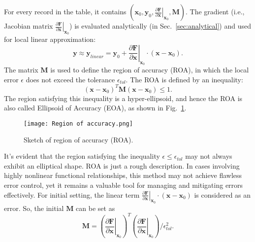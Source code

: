 For every record in the table, it contains $(\mathbf{x}_0,\mathbf{y}_0,\left.\frac{\partial  \mathbf{F}}{\partial \mathbf{x}}\right|_{\mathbf{x}_0}, \mathbf{M})$.
The gradient (i.e., Jacobian matrix $\left.\frac{\partial  \mathbf{F}}{\partial \mathbf{x}}\right|_{\mathbf{x}_0}$) is evaluated analytically (in Sec.~\ref{sec:analytical}) and used for local linear approximation:
$$\mathbf{y}\approx\mathbf{y}_{linear}=\mathbf{y}_0+\left.\frac{\partial  \mathbf{F}}{\partial \mathbf{x}}\right|_{\mathbf{x}_0}\cdot\left(\mathbf{x}-\mathbf{x}_0\right).$$
The matrix $\mathbf{M}$ is used to define the region of accuracy (ROA), in which the local error
$\epsilon$ does not exceed the tolerance $\epsilon_{tol}$. The ROA is defined by an inequality:
$$\left(\mathbf{x}-\mathbf{x}_0\right)^T \mathbf{M} \left(\mathbf{x}-\mathbf{x}_0\right) \leq 1.$$
The region satisfying this inequality is a hyper-ellipsoid, and hence the ROA is also called Ellipsoid of Accuracy (EOA), as shown in Fig.~\ref{ISAT_ROA}.
\begin{figure}[htbp]
	\centering
	\texttt{[image: Region of accuracy.png]}
	\caption{Sketch of region of accuracy (ROA).}
	\label{ISAT_ROA}
\end{figure}
It's evident that the region satisfying the inequality $ \epsilon \leq \epsilon_{tol}$ may not always exhibit an elliptical shape. ROA is just a rough description. In cases involving highly nonlinear functional relationships, this method may not achieve flawless error control, yet it remains a valuable tool for managing and mitigating errors effectively.
For initial setting, the linear term $\left.\frac{\partial  \mathbf{F}}{\partial \mathbf{x}}\right|_{\mathbf{x}_0}\cdot\left(\mathbf{x}-\mathbf{x}_0\right)$ is considered as an error. So, the initial $\mathbf{M}$ can be set as
$$\mathbf{M}=\left(\left.\frac{\partial  \mathbf{F}}{\partial \mathbf{x}}\right|_{\mathbf{x}_0}\right)^T \left(\left.\frac{\partial  \mathbf{F}}{\partial \mathbf{x}}\right|_{\mathbf{x}_0}\right)/\epsilon_{tol}^2.$$


